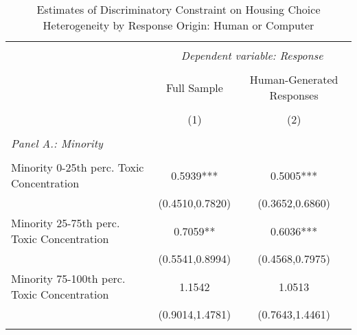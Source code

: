                                   \begin{table}[H] \scriptsize \centering \begin{threeparttable} \captionsetup{justification=centering}   \caption{Estimates of Discriminatory Constraint on Housing Choice \\ Heterogeneity by Response Origin: Human or Computer}   \label{tab:heterogeneitycomputer}  \begin{tabular}{@{\extracolsep{5pt}}lcc} \\[-1.8ex]\hline \hline \\[-1.8ex]  & \multicolumn{2}{c}{\textit{Dependent variable: {\it  Response}}} \\  \cline{2-3}  \\[-1.8ex] & Full Sample & Human-Generated Responses  \\ \\[-1.8ex] & (1) & (2)  \\ \hline \\[-1.8ex]         
{\it Panel A.: Minority } \\                                 &  &    \\
Minority 0-25th perc. Toxic Concentration&      0.5939***&      0.5005***\\
                    &(0.4510,0.7820)   &(0.3652,0.6860)   \\
Minority 25-75th perc. Toxic Concentration&      0.7059** &      0.6036***\\
                    &(0.5541,0.8994)   &(0.4568,0.7975)   \\
Minority 75-100th perc. Toxic Concentration&      1.1542   &      1.0513   \\
                    &(0.9014,1.4781)   &(0.7643,1.4461)   \\
       \hline \\[-1.8ex] 
         

\end{tabular}
\end{threeparttable}
\end{table}
